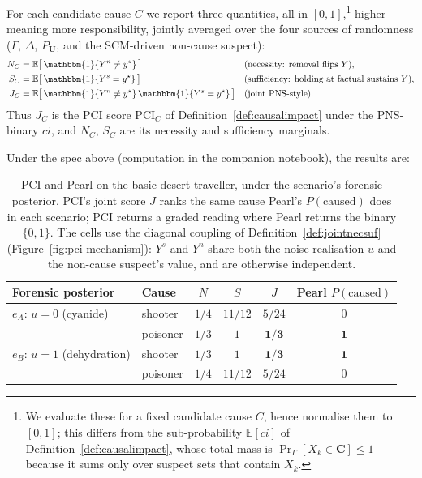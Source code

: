 For each candidate cause $C$ we report three quantities, all in $[0,1]$,\footnote{We evaluate these
for a fixed candidate cause $C$, hence normalise them to $[0,1]$; this differs
from the sub-probability $\mathbb{E}[ci]$ of Definition~\ref{def:causalimpact}, whose
total mass is $\Pr_\Gamma[X_k\in\mathbf{C}]\le 1$ because it sums only over suspect sets
that contain $X_k$.}
higher meaning more responsibility, jointly averaged over the four sources
of randomness ($\Gamma$, $\Delta$, $P_{\mathbf{U}}$, and the SCM-driven
non-cause suspect):
\begin{equation}\label{eq:nsj}
\begin{aligned}
N_C &= \mathbb{E}\bigl[\,\mathbbm{1}\{Y^n \neq y^\star\}\,\bigr]
       &&\text{(necessity: removal flips $Y$)},\\
S_C &= \mathbb{E}\bigl[\,\mathbbm{1}\{Y^s = y^\star\}\,\bigr]
       &&\text{(sufficiency: holding at factual sustains $Y$)},\\
J_C &= \mathbb{E}\bigl[\,\mathbbm{1}\{Y^n \neq y^\star\}\,\mathbbm{1}\{Y^s = y^\star\}\,\bigr]
       &&\text{(joint PNS-style)}.
\end{aligned}
\end{equation}
Thus $J_C$ is the PCI score $\mathrm{PCI}_C$ of Definition~\ref{def:causalimpact} under
the PNS-binary $ci$, and $N_C$, $S_C$ are its necessity and sufficiency marginals.

Under the spec above (computation in the companion notebook), the results are:

\begin{table}[ht]
\centering
\setlength{\tabcolsep}{4pt}
\begin{tabular}{llcccc}
\toprule
Forensic posterior & Cause & $N$ & $S$ & $J$ & Pearl $P(\text{caused})$ \\
\midrule
$e_A$: $u=0$ (cyanide) & shooter   & $1/4$ & $11/12$ & $5/24$ & $0$ \\
                       & poisoner  & $1/3$ & $1$     & $\mathbf{1/3}$ & $\mathbf{1}$ \\
\addlinespace
$e_B$: $u=1$ (dehydration) & shooter   & $1/3$ & $1$     & $\mathbf{1/3}$ & $\mathbf{1}$ \\
                                                      & poisoner  & $1/4$ & $11/12$ & $5/24$ & $0$ \\
\bottomrule
\end{tabular}
\caption{PCI and Pearl on the basic desert traveller, under the scenario's
forensic posterior. PCI's joint score $J$ ranks the same cause Pearl's
$P(\text{caused})$ does in each scenario; PCI returns a graded reading where
Pearl returns the binary $\{0, 1\}$. The cells use the diagonal coupling of
Definition~\ref{def:jointnecsuf} (Figure~\ref{fig:pci-mechanism}): $Y^s$ and
$Y^n$ share both the noise realisation $u$ and the non-cause suspect's value,
and are otherwise independent.}
\label{tab:pci-basic-dt}
\end{table}

